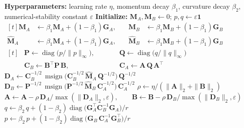 \documentclass[11pt]{article}
\newcommand{\mat}[1]{\bm{#1}}
\DeclareMathOperator{\diag}{diag}
\DeclareMathOperator{\msign}{msign}          %
\newcommand{\norm}[1]{\| #1\|}
\newcommand{\methodname}{PoLoRA\xspace}
\begin{document}
\begin{algorithm}[t]
\caption{\methodname{} step for one LoRA pair $(\mat{A},\mat{B})$}
\label{alg:ours}
\begin{algorithmic}[1]
\Statex \textbf{Hyperparameters:} learning rate $\eta$, momentum decay $\beta_1$, curvature decay $\beta_2$, numerical-stability constant $\varepsilon$
\Statex \textbf{Initialize:} $\mat{M}_A, \mat{M}_B \gets 0$; \quad $p, q \gets \varepsilon\mathbf{1}$
\Statex
{}
\State $\begin{aligned}[t]
  \mat{M}_A &\gets \beta_1 \mat{M}_A+(1-\beta_1)\mat{G}_A, &\quad \mat{M}_B &\gets \beta_1 \mat{M}_B+(1-\beta_1)\mat{G}_B\\[-4pt]
  \widehat{\mat{M}}_A &\gets \beta_1 \mat{M}_A+(1-\beta_1)\mat{G}_A, &\quad \widehat{\mat{M}}_B &\gets \beta_1 \mat{M}_B+(1-\beta_1)\mat{G}_B
\end{aligned}$  \label{ln:mom}
\Statex
{}
\State $\begin{aligned}[t]
  &\mat{P} \gets \diag\!\big(p/\norm{p}_\infty\big), &&\qquad \mat{Q} \gets \diag\!\big(q/\norm{q}_\infty\big)\\[-4pt]
  &\mat{C}_B \gets \mat{B}^\top \mat{P}\, \mat{B}, &&\qquad \mat{C}_A \gets \mat{A}\,\mat{Q}\, \mat{A}^\top
\end{aligned}$  \label{ln:pqnorm}
\State $\mat{D}_A\gets \mat{C}_B^{-1/2}\,\msign\big(\mat{C}_B^{-1/2}\,\widehat{\mat{M}}_A\,\mat{Q}^{-1/2}\big)\,\mat{Q}^{-1/2}$  \label{ln:Aspectral}
\State $\mat{D}_B\gets \mat{P}^{-1/2}\,\msign\big(\mat{P}^{-1/2}\,\widehat{\mat{M}}_B\,\mat{C}_A^{-1/2}\big)\,\mat{C}_A^{-1/2}$  \label{ln:Bspectral}
\Statex
{}
\State $\rho\gets\eta/(\norm{\mat{A}}_2+\norm{\mat{B}}_2)$  \label{ln:rho}
\State $\mat{A}\gets \mat{A}-\rho\,\mat{D}_A/\max(\norm{\mat{D}_A}_2,\varepsilon), \qquad \mat{B}\gets \mat{B}-\rho\,\mat{D}_B/\max(\norm{\mat{D}_B}_2,\varepsilon)$ \label{ln:spectralnormupdate}
\Statex
{}
\State $q\gets\beta_2\, q+(1-\beta_2)\diag\big(\mat{G}_A^\top \mat{C}_B^{-1} \mat{G}_A\big)/r$   \label{ln:qmom}
\State $p\gets\beta_2\, p+(1-\beta_2)\diag\big(\mat{G}_B\, \mat{C}_A^{-1} \mat{G}_B^\top\big)/r$  \label{ln:pmom}
\end{algorithmic}
\end{algorithm}
% 
\end{document}

